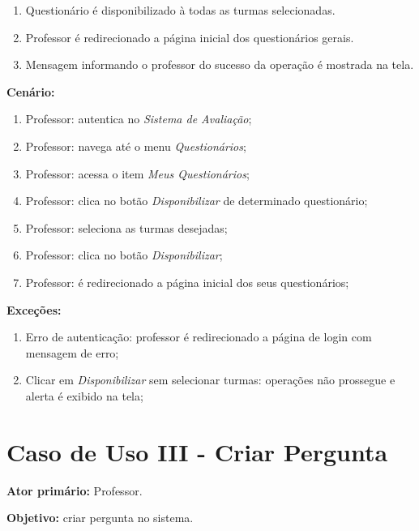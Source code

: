 \documentclass[
  12pt,       %
  openright,      %
  oneside,      %
  a4paper,      %
  english,      %
  french,        %
  spanish,     %
  brazil        %
  ]{abntex2-decsi}
\begin{document}
\begin{apendicesenv}
\begin{enumerate}
              \item Questionário é disponibilizado à todas as turmas selecionadas. 
              \item Professor é redirecionado a página inicial dos questionários gerais.
              \item Mensagem informando o professor do sucesso da operação é mostrada na tela.

              \end{enumerate}

          \textbf{Cenário:}

          \begin{enumerate}
              \item Professor: autentica no \textit{Sistema de Avaliação};
              \item Professor: navega até o menu \textit{Questionários};
              \item Professor: acessa o item \textit{Meus Questionários};
              \item Professor: clica no botão \textit{Disponibilizar} de determinado questionário;
              \item Professor: seleciona as turmas desejadas;
              \item Professor: clica no botão \textit{Disponibilizar};
              \item Professor: é redirecionado a página inicial dos seus questionários;
          \end{enumerate}

          \textbf{Exceções:}

              \begin{enumerate}	
                  \item Erro de autenticação: professor é redirecionado a página de login com mensagem de erro;
                  \item Clicar em \textit{Disponibilizar} sem selecionar turmas: operações não prossegue e alerta é exibido na tela;
              \end{enumerate}
    
    \newpage
    
	\section{Caso de Uso III - Criar Pergunta}
    
	\textbf{Ator primário:} Professor.
				
    \textbf{Objetivo:} criar pergunta no sistema.
    

\end{apendicesenv}
\end{document}
